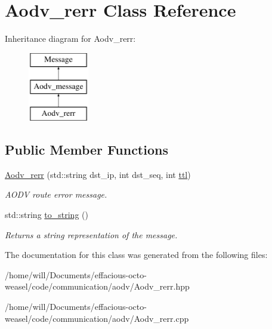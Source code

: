 \hypertarget{class_aodv__rerr}{}\section{Aodv\+\_\+rerr Class Reference}
\label{class_aodv__rerr}
Inheritance diagram for Aodv\+\_\+rerr\+:\begin{figure}[H]
\begin{center}
\leavevmode
\includegraphics[height=3.000000cm]{class_aodv__rerr}
\end{center}
\end{figure}
\subsection*{Public Member Functions}
\begin{DoxyCompactItemize}
\item 
\hyperlink{class_aodv__rerr_a1fa8a35aaff95b5a9369415267f03894}{Aodv\+\_\+rerr} (std\+::string dst\+\_\+ip, int dst\+\_\+seq, int \hyperlink{class_aodv__message_a4d7215436d8efb6bcced6ae6a2dc6f33}{ttl})\hypertarget{class_aodv__rerr_a1fa8a35aaff95b5a9369415267f03894}{}\label{class_aodv__rerr_a1fa8a35aaff95b5a9369415267f03894}

\begin{DoxyCompactList}\small\item\em A\+O\+DV route error message. \end{DoxyCompactList}\item 
std\+::string \hyperlink{class_aodv__rerr_a36e4196ed678e4a455aba92823caea8d}{to\+\_\+string} ()\hypertarget{class_aodv__rerr_a36e4196ed678e4a455aba92823caea8d}{}\label{class_aodv__rerr_a36e4196ed678e4a455aba92823caea8d}

\begin{DoxyCompactList}\small\item\em Returns a string representation of the message. \end{DoxyCompactList}\end{DoxyCompactItemize}


The documentation for this class was generated from the following files\+:\begin{DoxyCompactItemize}
\item 
/home/will/\+Documents/effacious-\/octo-\/weasel/code/communication/aodv/Aodv\+\_\+rerr.\+hpp\item 
/home/will/\+Documents/effacious-\/octo-\/weasel/code/communication/aodv/Aodv\+\_\+rerr.\+cpp\end{DoxyCompactItemize}
